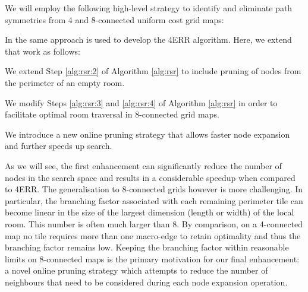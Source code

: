 We will employ the following high-level strategy to
identify and eliminate path symmetries from 4 and 8-connected uniform cost grid maps:


In \cite{harabor10} the same approach is used to develop the 4ERR algorithm.
Here, we extend that work as follows:
\begin{enumerate}
\item{
We extend Step \ref{alg:rsr:2} of Algorithm \ref{alg:rsr} 
to include pruning of nodes from the perimeter of an empty room.
}
\item{
We modify Steps \ref{alg:rsr:3} and \ref{alg:rsr:4} of Algorithm
\ref{alg:rsr} in order to facilitate optimal room traversal in 8-connected grid
maps. 
\item{We introduce a new online pruning strategy that allows faster node
expansion and further speeds up search.}
}
\end{enumerate}
As we will see, the first enhancement can significantly reduce the number of nodes
in the search space and results in a considerable speedup when compared to 4ERR.
The generalisation to 8-connected grids however is more challenging.
In particular, the branching factor associated with each remaining perimeter tile 
can become linear in the size of the largest dimension (length or width) of the local room. 
This number is often much larger than 8. 
By comparison, on a 4-connected map no tile requires more than one macro-edge 
to retain optimality and thus the branching factor remains low.
Keeping the branching factor within reasonable limits on 8-connected maps
is the primary motivation
for our final enhancement: a novel online pruning strategy which attempts to
reduce the number of neighbours that need to be considered during each node 
expansion operation.
